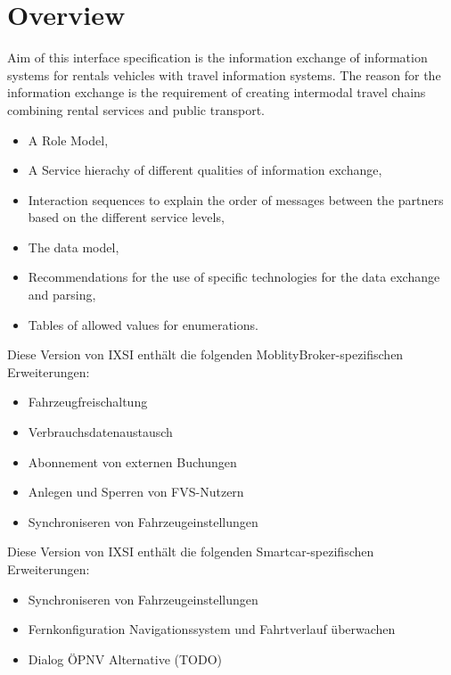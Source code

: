 \chapter{Overview}
\label{cha:Zusammenfassung}

Aim of this interface specification is the information exchange of information systems for rentals vehicles with travel information systems.
The reason for the information exchange is the requirement of creating intermodal travel chains combining rental services and public transport.

\begin{itemize}
\item A Role Model,
\item A Service hierachy of different qualities of information exchange,
\item Interaction sequences to explain the order of messages between the partners based on the different service levels,
\item The data model,
\item Recommendations for the use of specific technologies for the data exchange and parsing,
\item Tables of allowed values for enumerations.
\end{itemize}
Diese Version von IXSI enthält die folgenden MoblityBroker-spezifischen Erweiterungen:
\begin{itemize}
	\item Fahrzeugfreischaltung
	\item Verbrauchsdatenaustausch
	\item Abonnement von externen Buchungen
	\item Anlegen und Sperren von FVS-Nutzern
	\item Synchroniseren von Fahrzeugeinstellungen
\end{itemize}
Diese Version von IXSI enthält die folgenden Smartcar-spezifischen Erweiterungen:
\begin{itemize}
	\item Synchroniseren von Fahrzeugeinstellungen
	\item Fernkonfiguration Navigationssystem und Fahrtverlauf überwachen
	\item Dialog ÖPNV Alternative (TODO)
\end{itemize}
